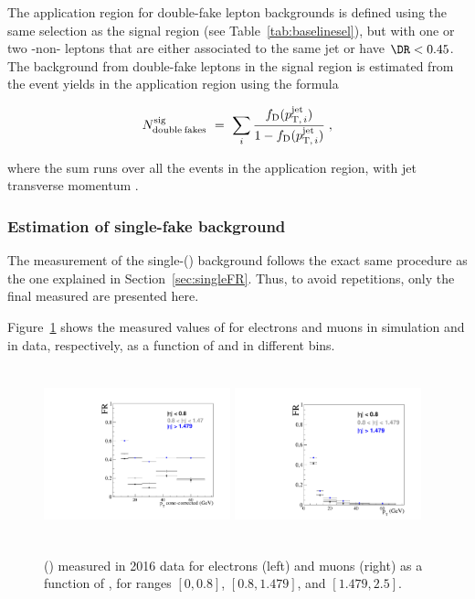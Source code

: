 The application region for double-fake lepton backgrounds 
is defined using the same selection as the signal region (see
Table~\ref{tab:baselinesel}), but with one or two \fo -non-\tD
leptons that are either associated to the same jet or have $\DR<0.45$. 
The background from double-fake leptons in the signal region is
estimated from the event yields in the application region using
the formula
\begin{linenomath}
  \begin{equation}
    \label{eq:dFRbkg}
    N_{\mathrm{double\: fakes}}^{\mathrm{sig}} ~=~ 
    \sum_i\frac{f_{\mathrm{D}}(p_{\mathrm{T,\,}i}^{\mathrm{jet}})}{1-f_{\mathrm{D}}(p_{\mathrm{T,\,}i}^{\mathrm{jet}})}\;,
  \end{equation}
\end{linenomath}
where the sum runs over all the events in the application region, with jet transverse momentum .
\subsubsection{Estimation of single-fake background}
\label{sec:singleFakeBkg}

The measurement of the single-\fr (\sfr) background follows the exact same
procedure as the one explained in Section~\ref{sec:singleFR}. Thus, to
avoid repetitions, only the final measured \fr are presented here.

Figure~\ref{fig:sfr_data} shows the measured
values of \sfr for electrons and muons in simulation and in data,
respectively, as a function of \ptc and in different \abseta bins.
\begin{figure}[h!]
  \centering
  \includegraphics[height=5cm, width=5.4cm]{Figures/c6/backgrounds/FR/sFR/data/electrons.pdf}
  \includegraphics[height=5cm, width=5.4cm]{Figures/c6/backgrounds/FR/sFR/data/muons.pdf}\\
  \caption{\fr (\sfr) measured in 2016 data for electrons (left) and
    muons (right) as a function of \ptc, for \abseta ranges $[0,0.8]$, $[0.8,1.479]$, and $[1.479,2.5]$.}
  \label{fig:sfr_data}
\end{figure}

